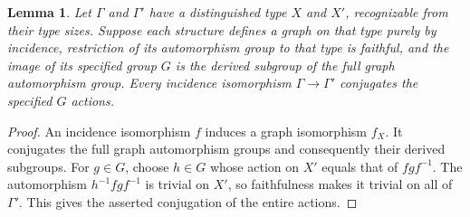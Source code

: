 \documentclass[11pt]{article}
\newtheorem{lemma}{Lemma}
\begin{document}
\begin{lemma}\label{characteristic}
Let $\Gamma$ and $\Gamma'$ have a distinguished type $X$ and $X'$,
recognizable from their type sizes. Suppose each structure defines a
graph on that type purely by incidence, restriction of its automorphism
group to that type is faithful, and the image of its specified group
$G$ is the derived subgroup of the full graph automorphism group.
Every incidence isomorphism $\Gamma\longrightarrow\Gamma'$ conjugates
the specified $G$ actions.
\end{lemma}
\begin{proof}
An incidence isomorphism $f$ induces a graph isomorphism $f_X$. It
conjugates the full graph automorphism groups and consequently their
derived subgroups. For $g\in G$, choose $h\in G$ whose action on $X'$
equals that of $fgf^{-1}$. The automorphism $h^{-1}fgf^{-1}$ is trivial
on $X'$, so faithfulness makes it trivial on all of $\Gamma'$.
This gives the asserted conjugation of the entire actions.
\end{proof}
\end{document}
